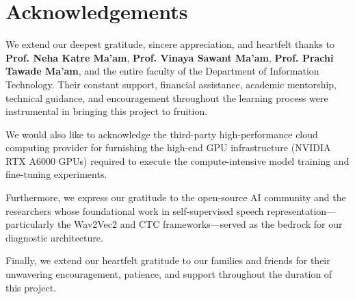 \chapter*{Acknowledgements}

We extend our deepest gratitude, sincere appreciation, and heartfelt thanks to \textbf{Prof. Neha Katre Ma'am}, \textbf{Prof. Vinaya Sawant Ma'am}, \textbf{Prof. Prachi Tawade Ma'am}, and the entire faculty of the Department of Information Technology. Their constant support, financial assistance, academic mentorship, technical guidance, and encouragement throughout the learning process were instrumental in bringing this project to fruition.

We would also like to acknowledge the third-party high-performance cloud computing provider for furnishing the high-end GPU infrastructure (NVIDIA RTX A6000 GPUs) required to execute the compute-intensive model training and fine-tuning experiments.

Furthermore, we express our gratitude to the open-source AI community and the researchers whose foundational work in self-supervised speech representation—particularly the Wav2Vec2 and CTC frameworks—served as the bedrock for our diagnostic architecture.

Finally, we extend our heartfelt gratitude to our families and friends for their unwavering encouragement, patience, and support throughout the duration of this project.
